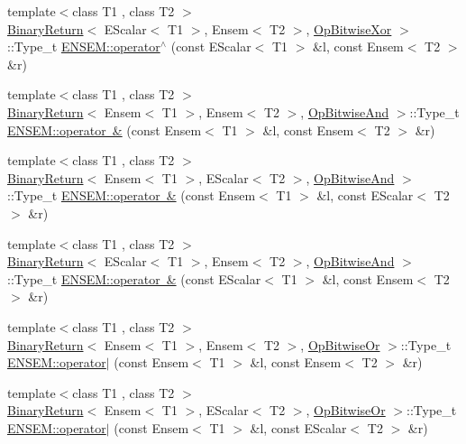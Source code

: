 \begin{DoxyCompactItemize}
\item 
{\footnotesize template$<$class T1 , class T2 $>$ }\\\mbox{\hyperlink{structBinaryReturn}{Binary\+Return}}$<$ E\+Scalar$<$ T1 $>$, Ensem$<$ T2 $>$, \mbox{\hyperlink{structOpBitwiseXor}{Op\+Bitwise\+Xor}} $>$\+::Type\+\_\+t \mbox{\hyperlink{group__eensem_gac576149a62d51c7020e2452341351129}{E\+N\+S\+E\+M\+::operator$^\wedge$}} (const E\+Scalar$<$ T1 $>$ \&l, const Ensem$<$ T2 $>$ \&r)
\item 
{\footnotesize template$<$class T1 , class T2 $>$ }\\\mbox{\hyperlink{structBinaryReturn}{Binary\+Return}}$<$ Ensem$<$ T1 $>$, Ensem$<$ T2 $>$, \mbox{\hyperlink{structOpBitwiseAnd}{Op\+Bitwise\+And}} $>$\+::Type\+\_\+t \mbox{\hyperlink{group__eensem_gaeb51787a8e99aa2d96b292b6b53160fb}{E\+N\+S\+E\+M\+::operator \&}} (const Ensem$<$ T1 $>$ \&l, const Ensem$<$ T2 $>$ \&r)
\item 
{\footnotesize template$<$class T1 , class T2 $>$ }\\\mbox{\hyperlink{structBinaryReturn}{Binary\+Return}}$<$ Ensem$<$ T1 $>$, E\+Scalar$<$ T2 $>$, \mbox{\hyperlink{structOpBitwiseAnd}{Op\+Bitwise\+And}} $>$\+::Type\+\_\+t \mbox{\hyperlink{group__eensem_gadd38c6dbde8cad60658e2a3429480978}{E\+N\+S\+E\+M\+::operator \&}} (const Ensem$<$ T1 $>$ \&l, const E\+Scalar$<$ T2 $>$ \&r)
\item 
{\footnotesize template$<$class T1 , class T2 $>$ }\\\mbox{\hyperlink{structBinaryReturn}{Binary\+Return}}$<$ E\+Scalar$<$ T1 $>$, Ensem$<$ T2 $>$, \mbox{\hyperlink{structOpBitwiseAnd}{Op\+Bitwise\+And}} $>$\+::Type\+\_\+t \mbox{\hyperlink{group__eensem_ga81252fa8c928f420f2676e632c49a421}{E\+N\+S\+E\+M\+::operator \&}} (const E\+Scalar$<$ T1 $>$ \&l, const Ensem$<$ T2 $>$ \&r)
\item 
{\footnotesize template$<$class T1 , class T2 $>$ }\\\mbox{\hyperlink{structBinaryReturn}{Binary\+Return}}$<$ Ensem$<$ T1 $>$, Ensem$<$ T2 $>$, \mbox{\hyperlink{structOpBitwiseOr}{Op\+Bitwise\+Or}} $>$\+::Type\+\_\+t \mbox{\hyperlink{group__eensem_ga535dbb02f2bee6036e22a754b7144be1}{E\+N\+S\+E\+M\+::operator$\vert$}} (const Ensem$<$ T1 $>$ \&l, const Ensem$<$ T2 $>$ \&r)
\item 
{\footnotesize template$<$class T1 , class T2 $>$ }\\\mbox{\hyperlink{structBinaryReturn}{Binary\+Return}}$<$ Ensem$<$ T1 $>$, E\+Scalar$<$ T2 $>$, \mbox{\hyperlink{structOpBitwiseOr}{Op\+Bitwise\+Or}} $>$\+::Type\+\_\+t \mbox{\hyperlink{group__eensem_gadd9d57d20a2060d811fba3899bcfcd73}{E\+N\+S\+E\+M\+::operator$\vert$}} (const Ensem$<$ T1 $>$ \&l, const E\+Scalar$<$ T2 $>$ \&r)

\end{DoxyCompactItemize}
